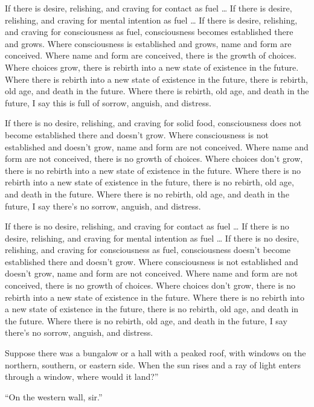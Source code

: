 \documentclass[12pt,openany]{book}%
\begin{document}
If there is desire, relishing, and craving for contact as fuel … If there is desire, relishing, and craving for mental intention as fuel … If there is desire, relishing, and craving for consciousness as fuel, consciousness becomes established there and grows. Where consciousness is established and grows, name and form are conceived. Where name and form are conceived, there is the growth of choices. Where choices grow, there is rebirth into a new state of existence in the future. Where there is rebirth into a new state of existence in the future, there is rebirth, old age, and death in the future. Where there is rebirth, old age, and death in the future, I say this is full of sorrow, anguish, and distress. 

If there is no desire, relishing, and craving for solid food, consciousness does not become established there and doesn’t grow. Where consciousness is not established and doesn’t grow, name and form are not conceived. Where name and form are not conceived, there is no growth of choices. Where choices don’t grow, there is no rebirth into a new state of existence in the future. Where there is no rebirth into a new state of existence in the future, there is no rebirth, old age, and death in the future. Where there is no rebirth, old age, and death in the future, I say there’s no sorrow, anguish, and distress. 

If there is no desire, relishing, and craving for contact as fuel … If there is no desire, relishing, and craving for mental intention as fuel … If there is no desire, relishing, and craving for consciousness as fuel, consciousness doesn’t become established there and doesn’t grow. Where consciousness is not established and doesn’t grow, name and form are not conceived. Where name and form are not conceived, there is no growth of choices. Where choices don’t grow, there is no rebirth into a new state of existence in the future. Where there is no rebirth into a new state of existence in the future, there is no rebirth, old age, and death in the future. Where there is no rebirth, old age, and death in the future, I say there’s no sorrow, anguish, and distress. 

Suppose there was a bungalow or a hall with a peaked roof, with windows on the northern, southern, or eastern side. When the sun rises and a ray of light enters through a window, where would it land?” 

“On the western wall, sir.” 
\end{document}
